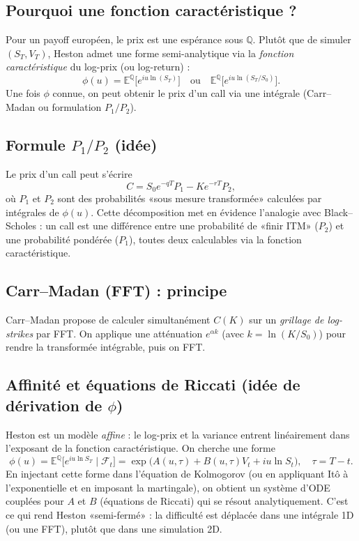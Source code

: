 \documentclass[11pt,a4paper]{report}
\theoremstyle{definition}
\theoremstyle{plain}
\theoremstyle{remark}
\newcommand{\E}{\mathbb{E}}
\newcommand{\1}{\mathbf{1}}
\newcommand{\Qmeas}{\mathbb{Q}}
\newcommand{\F}{\mathcal{F}}
\begin{document}
\subsection*{Pourquoi une fonction caractéristique ?}
Pour un payoff européen, le prix est une espérance sous $\Qmeas$. Plutôt que de simuler $(S_T,V_T)$, Heston admet une forme semi-analytique via la \emph{fonction caractéristique} du log-prix (ou log-return) :
\[
\phi(u)=\E^{\Qmeas}\big[e^{iu\ln(S_T)}\big]\quad \text{ou}\quad \E^{\Qmeas}\big[e^{iu\ln(S_T/S_0)}\big].
\]
Une fois $\phi$ connue, on peut obtenir le prix d'un call via une intégrale (Carr--Madan ou formulation $P_1/P_2$).

\subsection*{Formule $P_1/P_2$ (idée)}
Le prix d'un call peut s'écrire
\[
C = S_0e^{-qT}P_1 - Ke^{-rT}P_2,
\]
où $P_1$ et $P_2$ sont des probabilités «sous mesure transformée» calculées par intégrales de $\phi(u)$.
Cette décomposition met en évidence l'analogie avec Black--Scholes : un call est une différence entre une probabilité de «finir ITM» ($P_2$) et une probabilité pondérée ($P_1$), toutes deux calculables via la fonction caractéristique.

\subsection*{Carr--Madan (FFT) : principe}
Carr--Madan propose de calculer simultanément $C(K)$ sur un \emph{grillage de log-strikes} par FFT. On applique une atténuation $e^{\alpha k}$ (avec $k=\ln(K/S_0)$) pour rendre la transformée intégrable, puis on FFT.

\subsection*{Affinité et équations de Riccati (idée de dérivation de $\phi$)}
Heston est un modèle \emph{affine} : le log-prix et la variance entrent linéairement dans l'exposant de la fonction caractéristique.
On cherche une forme
\[
\phi(u)=\E^{\Qmeas}\big[e^{iu\ln S_T}\mid \F_t\big]=\exp\big(A(u,\tau)+B(u,\tau)V_t+iu\ln S_t\big),\quad \tau=T-t.
\]
En injectant cette forme dans l'équation de Kolmogorov (ou en appliquant Itô à l'exponentielle et en imposant la martingale), on obtient un système d'ODE couplées pour $A$ et $B$ (équations de Riccati) qui se résout analytiquement.
C'est ce qui rend Heston «semi-fermé» : la difficulté est déplacée dans une intégrale 1D (ou une FFT), plutôt que dans une simulation 2D.
\end{document}
